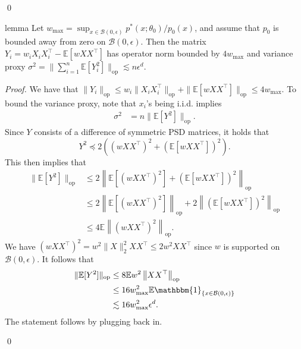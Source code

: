 \documentclass[11pt]{article}
\begin{document}
\qed{}

\begin{restatable}{lemma}{}\label{lemma: operator norm and var proxy}
    Let $w_{\max} = \sup_{x \in \mathcal{B}(0, \epsilon)}p^*(x; \theta_0)/p_0(x)$, and assume that $p_0$ is bounded away from zero on $\mathcal{B}(0, \epsilon)$. Then the matrix $Y_i = w_iX_iX_i^{\top} - \mathbb{E}[wXX^{\top}]$ has operator norm bounded by $4w_{\max}$ and variance proxy $\sigma^2 = \|\sum_{i = 1}^n \mathbb{E}[Y_i^2]\|_{\text{op}} \lesssim n\epsilon^d$. 
\end{restatable} 
\noindent \textit{Proof.} We have that $\|Y_i\|_{\text{op}} \leq w_i\|X_iX_i^{\top}\|_{\text{op}}  + \|\mathbb{E}[wXX^{\top}]\|_{\text{op}} \leq 4w_{\max}$. To bound the variance proxy, note that $x_i$'s being i.i.d. implies
\begin{align*}
    \sigma^2 &= n\| \mathbb{E}[Y^2]\|_{\text{op}}.
\end{align*}
Since $Y$ consists of a difference of symmetric PSD matrices, it holds that \[Y^2 \preceq 2\left((wXX^{\top})^2 + (\mathbb{E}[wXX^{\top}])^2\right).\] This then implies that
\begin{align*}
    \|\mathbb{E}[Y^2]\|_{\text{op}} &\leq 2\left\|\mathbb{E}[(wXX^{\top})^2] + (\mathbb{E}[wXX^{\top}])^2\right\|_{\text{op}} \\
    &\leq 2\left\|\mathbb{E}[(wXX^{\top})^2]\right\|_{\text{op}} + 2\left\|(\mathbb{E}[wXX^{\top}])^2\right\|_{\text{op}} \\
    &\leq 4\mathbb{E}\left\|(wXX^{\top})^2\right\|_{\text{op}} \tag{Jensen's Inequality}.
\end{align*}
We have $(wXX^{\top})^2 = w^2\|X\|_2^2XX^{\top} \leq 2w^2XX^{\top}$ since $w$ is supported on $\mathcal{B}(0, \epsilon)$. It follows that
\begin{align*}
    \|\mathbb{E}[Y^2]\|_{\text{op}} &\leq 8\mathbb{E}w^2\left\|XX^{\top}\right\|_{\text{op}} \\
    &\leq16w_{\max}^2 \mathbb{E}\mathbbm{1}_{\{x \in \mathcal{B}(0, \epsilon)\}} \\
    &\lesssim 16w_{\max}^2\epsilon^d.
\end{align*}
The statement follows by plugging back in.

\qed{}
\end{document}
